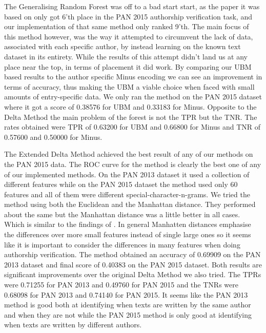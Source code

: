 The Generalising Random Forest was off to a bad start start, as the paper it
was based on \cite{pacheco2015} only got 6'th place in the PAN 2015 authorship
verification task, and our implementation of that same method only ranked 9'th.
The main focus of this method however, was the way it attempted to circumvent
the lack of data, associated with each specific author, by instead learning
on the known text dataset in its entirety. While the results of this attempt
didn't land us at any place near the top, in terms of placement it did work. By
comparing our \gls{UBM} based results to the author specific Minus encoding we
can see an improvement in terms of accuracy, thus making the \gls{UBM} a viable
choice when faced with small amounts of entry-specific data. We only ran the
method on the PAN 2015 dataset where it got a score of 0.38576 for \gls{UBM} and
0.33183 for Minus. Opposite to the Delta Method the main problem of the forest
is not the \gls{TPR} but the \gls{TNR}. The rates obtained were \gls{TPR} of
0.63200 for \gls{UBM} and 0.66800 for Minus and \gls{TNR} of 0.57600 and 0.50000
for Minus.

The Extended Delta Method achieved the best result of any of our methods on
the PAN 2015 data. The ROC curve for the method is clearly the best one of
any of our implemented methods. On the PAN 2013 dataset it used a collection
of different features while on the PAN 2015 dataset the method used only 60
features and all of them were different special-character-n-grams. We tried the
method using both the Euclidean and the Manhattan distance. They performed about
the same but the Manhattan distance was a little better in all cases. Which
is similar to the findings of \cite{evert2015towards}. In general Manhatten
distances emphasise the differences over more small features instead of single
large ones so it seems like it is important to consider the differences in many
features when doing authorship verification. The method obtained an accuracy
of 0.69909 on the PAN 2013 dataset and final score of 0.40383 on the PAN 2015
dataset. Both results are significant improvements over the original Delta
Method we also tried. The \gls{TPR}s were 0.71255 for PAN 2013 and 0.49760 for
PAN 2015 and the \gls{TNR}s were 0.68098 for PAN 2013 and 0.74140 for PAN 2015.
It seems like the PAN 2013 method is good both at identifying when texts are
written by the same author and when they are not while the PAN 2015 method is
only good at identifying when texts are written by different authors.

